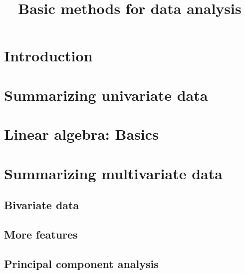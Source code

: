 \documentclass{article}
\title{Basic methods for data analysis}
\begin{document}
\section{Introduction}
\section{Summarizing univariate data}
\section{Linear algebra: Basics}
\section{Summarizing multivariate data}
\subsection{Bivariate data}
\subsection{More features}
\subsection{Principal component analysis}
\section{}
\end{document}
